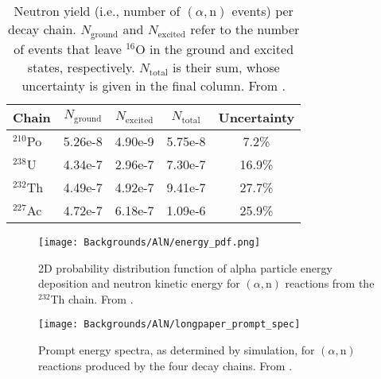\documentclass[../thesis.tex]{subfiles}
\begin{document}
\begin{table}[ht]
  \begin{tabular}{lcccc}
    \toprule
    Chain & $N_{\mathrm{ground}}$ & $N_{\mathrm{excited}}$ & $N_{\mathrm{total}}$ & Uncertainty  \\
    \midrule
    $^{210}$Po & 5.26e-8 & 4.90e-9 & 5.75e-8 & 7.2\%  \\
    $^{238}$U  & 4.34e-7 & 2.96e-7 & 7.30e-7 & 16.9\% \\
    $^{232}$Th & 4.49e-7 & 4.92e-7 & 9.41e-7 & 27.7\% \\
    $^{227}$Ac & 4.72e-7 & 6.18e-7 & 1.09e-6 & 25.9\% \\
    \bottomrule
  \end{tabular}
  \caption{Neutron yield (i.e., number of $(\alpha,\mathrm{n})$ events) per decay chain. $N_{\mathrm{ground}}$ and $N_{\mathrm{excited}}$ refer to the number of events that leave $^{16}$O in the ground and excited states, respectively. $N_{\mathrm{total}}$ is their sum, whose uncertainty is given in the final column. From \cite{Zhao_2014}.}
  \label{tab:bkgAlnNeutronYield}
\end{table}

\begin{figure}[ht]
  \texttt{[image: Backgrounds/AlN/energy\_pdf.png]}
  \caption{2D probability distribution function of alpha particle energy deposition and neutron kinetic energy for $(\alpha,\mathrm{n})$ reactions from the $^{232}$Th chain. From \cite{Zhao_2014}.}
  \label{fig:aln_energy_pdf}
\end{figure}

\begin{figure}[ht]
  \texttt{[image: Backgrounds/AlN/longpaper\_prompt\_spec]}
  \caption{Prompt energy spectra, as determined by simulation, for $(\alpha,\mathrm{n})$ reactions produced by the four decay chains. From \cite{An_2017}.}
  \label{fig:aln_longpaper_prompt_spec}
\end{figure}
\end{document}
